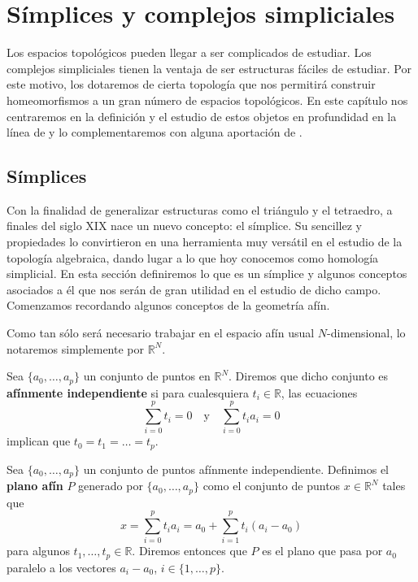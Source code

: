 
\chapter{Símplices y complejos simpliciales}

Los espacios topológicos pueden llegar a ser complicados de estudiar. Los
complejos simpliciales tienen la ventaja de ser estructuras fáciles de estudiar.
Por este motivo, los dotaremos de cierta topología que nos permitirá construir
homeomorfismos a un gran número de espacios topológicos. En este capítulo nos centraremos
en la definición y el estudio de estos objetos en profundidad en la línea de \cite{munkres2018elements}
y lo complementaremos con alguna aportación de \cite{lee2010introduction}.

\section{Símplices}
Con la finalidad de generalizar estructuras como el triángulo y el tetraedro, a
finales del siglo XIX nace un nuevo concepto: el símplice. Su sencillez y
propiedades lo convirtieron en una herramienta muy versátil en el estudio de la
topología algebraica, dando lugar a lo que hoy conocemos como homología simplicial.
En esta sección definiremos lo que es un símplice y algunos conceptos asociados
a él que nos serán de gran utilidad en el estudio de dicho campo. Comenzamos recordando
algunos conceptos de la geometría afín.

Como tan sólo será necesario trabajar en el espacio afín usual \(N\)-dimensional,
lo notaremos simplemente por \(\mathbb{R}^{N}\).

\begin{definicion}
	Sea \(\{a_{0}, \ldots, a_{p}\}\) un conjunto de puntos en \(\mathbb{R}^{N}\).
	Diremos que dicho conjunto es \textbf{afínmente independiente} si para cualesquiera
	\(t_{i}\in \mathbb{R}\), las ecuaciones
	\[
		\sum_{i=0}^{p}t_{i}=0 \quad \text{y}\quad \sum_{i=0}^{p}t_{i}a_{i}=0
	\]
	implican que \(t_{0}= t_{1}= \ldots = t_{p}\).
\end{definicion}

\begin{definicion}
	Sea \(\{a_{0}, \ldots, a_{p}\}\) un conjunto de puntos afínmente independiente.
	Definimos el \textbf{plano afín} \(P\) generado por \(\{a_{0}, \ldots, a_{p}\}\) como
	el conjunto de puntos \(x \in \mathbb{R}^{N}\) tales que
	\[
		x = \sum_{i=0}^{p}t_{i}a_{i}= a_{0}+ \sum_{i=1}^{p}t_{i}(a_{i}- a_{0})
	\]
	para algunos \(t_{1}, \ldots, t_{p}\in \mathbb{R}\). Diremos entonces que \(P\) es
	el plano que pasa por \(a_{0}\) paralelo a los vectores \(a_{i}- a_{0}\), \(i \in \{
	1, \ldots, p\}\).
\end{definicion}

